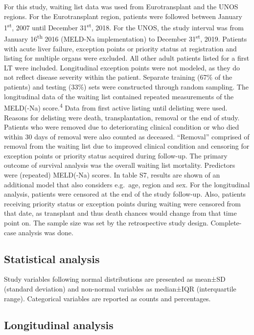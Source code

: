 \documentclass[11pt,english,]{book} %
\begin{document}
For this study, waiting list data was used from Eurotransplant and the UNOS regions. For the Eurotransplant region, patients were followed between January 1\textsuperscript{st}, 2007 until December 31\textsuperscript{st}, 2018. For the UNOS, the study interval was from January 16\textsuperscript{th} 2016 (MELD-Na implementation) to December 31\textsuperscript{st}, 2019. Patients with acute liver failure, exception points or priority status at registration and listing for multiple organs were excluded. All other adult patients listed for a first LT were included. Longitudinal exception points were not modeled, as they do not reflect disease severity within the patient. Separate training (67\% of the patients) and testing (33\%) sets were constructed through random sampling. The longitudinal data of the waiting list contained repeated measurements of the MELD(-Na) score.\textsuperscript{4} Data from first active listing until delisting were used. Reasons for delisting were death, transplantation, removal or the end of study. Patients who were removed due to deteriorating clinical condition or who died within 30 days of removal were also counted as deceased. ``Removal'' comprised of removal from the waiting list due to improved clinical condition and censoring for exception points or priority status acquired during follow-up. The primary outcome of survival analysis was the overall waiting list mortality. Predictors were (repeated) MELD(-Na) scores. In table S7, results are shown of an additional model that also considers e.g.~age, region and sex. For the longitudinal analysis, patients were censored at the end of the study follow-up. Also, patients receiving priority status or exception points during waiting were censored from that date, as transplant and thus death chances would change from that time point on. The sample size was set by the retrospective study design. Complete-case analysis was done.

\hypertarget{statistical-analysis-1}{%
\subsection*{Statistical analysis}\label{statistical-analysis-1}}

Study variables following normal distributions are presented as mean±SD (standard deviation) and non-normal variables as median±IQR (interquartile range). Categorical variables are reported as counts and percentages.

\hypertarget{longitudinal-analysis}{%
\subsection*{Longitudinal analysis}\label{longitudinal-analysis}}
\end{document}
